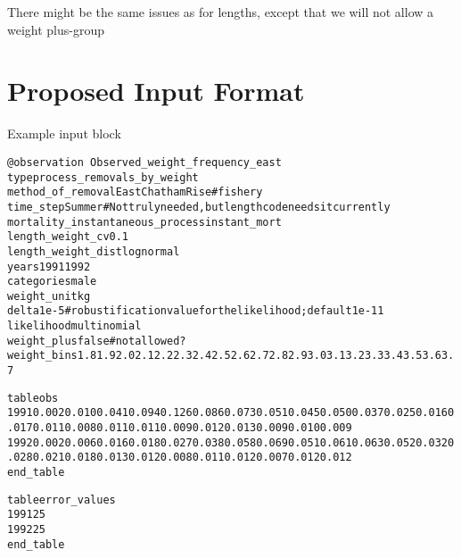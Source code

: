 \documentclass[a4paper,11pt,twoside,pdftex,draft]{article}
\begin{document}
There might be the same issues as for lengths, except that we will not allow a weight plus-group


\section{Proposed Input Format}

Example input block

\begin{alltt}
\texttt{@observation Observed\_weight\_frequency\_east}
type process\_removals\_by\_weight
method\_of\_removal EastChathamRise  # fishery
time\_step Summer # Not truly needed, but length code needs it currently
mortality\_instantaneous\_process instant\_mort
length\_weight\_cv 0.1
length\_weight\_dist lognormal
years 1991 1992
categories male
weight\_unit kg
delta 1e-5  # robustification value for the likelihood; default 1e-11
likelihood multinomial
weight\_plus false        #not allowed?
weight\_bins 1.8 1.9 2.0 2.1 2.2 2.3 2.4 2.5 2.6 2.7 2.8 2.9 3.0 3.1 3.2 3.3 3.4 3.5 3.6 3.7 % 3.8 3.9 4.0 4.1 4.2 4.3 4.4 4.5 4.6 4.7 4.8 4.9 5.0 5.1 5.2 5.3 5.4 5.5 5.6 5.7 5.8 5.9 6.0 6.1 6.2 6.3 6.4 6.5 6.6 6.7 6.8 6.9 7.0 7.1 7.2 7.3 7.4 7.5 7.6 7.7 7.8 7.9 8.0 8.1 8.2 8.3 8.4 8.5 8.6 8.7 8.8 8.9 9.0 9.1 9.2 9.3 9.4 9.5 9.6 9.7 9.8 9.9 10.0 10.1 10.2 10.3 10.4 10.5 10.6 10.7 10.8 10.9 11.0 11.1 11.2 11.3 11.4 11.5 11.6 11.7 11.8

table obs
1991 0.002 0.010 0.041 0.094 0.126 0.086 0.073 0.051 0.045 0.050 0.037 0.025 0.016 0.017 0.011 0.008 0.011 0.011 0.009 0.012 0.013 0.009 0.010 0.009 % 0.0100.0070.0080.0060.0050.0100.0080.0140.0080.0120.0060.0070.0090.0050.0070.0060.0040.0060.0040.0040.0070.0050.0020.0060.0040.0030.0040.0020.0040.0030.0020.0020.0020.0010.0020.0030.0010.0020.0010.0010.0010.0010.0010.0010.0010.0000.0010.0010.0000.0010.0010.0010.0010.0000.0010.0010.0010.0010.0010.0010.0000.0010.0000.0010.0000.0000.0010.0000.0000.0000.0000.0000.0000.0000.0000.001
1992 0.002 0.006 0.016 0.018 0.027 0.038 0.058 0.069 0.051 0.061 0.063 0.052 0.032 0.028 0.021 0.018 0.013 0.012 0.008 0.011 0.012 0.007 0.012 0.012 % 0.0150.0070.0090.0110.0090.0100.0140.0130.0120.0190.0110.0130.0130.0090.0100.0140.0080.0090.0060.0060.0080.0080.0050.0080.0070.0060.0030.0060.0060.0040.0020.0040.0070.0030.0040.0030.0020.0030.0020.0020.0020.0020.0020.0020.0020.0020.0020.0010.0010.0010.0020.0020.0010.0020.0020.0020.0010.0010.0010.0020.0010.0010.0010.0010.0010.0000.0010.0010.0000.0010.0010.0000.0000.0010.0000.001
end\_table

table error\_values
1991 25
1992 25
end\_table
\end{alltt}
\end{document}
